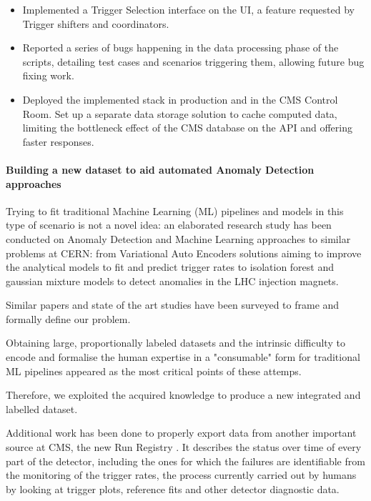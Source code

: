 \documentclass[a4, oneside, 11pt, nobib]{memoir}
\begin{document}
\begin{itemize}
		\item Implemented a Trigger Selection interface on the UI, a feature requested by Trigger shifters and coordinators.
		\item Reported a series of bugs happening in the data processing phase of the scripts, detailing test cases and  scenarios triggering them, allowing future bug fixing work.
		\item Deployed the implemented stack in production and in the CMS Control Room. Set up a separate data storage solution to cache computed data, limiting the bottleneck effect of the CMS database on the API and offering faster responses.

		\end{itemize}


		\paragraph{Building a new dataset to aid automated Anomaly Detection approaches}

		Trying to fit traditional Machine Learning (ML) pipelines and models in this type of scenario is not a novel idea: an elaborated research study has been conducted on Anomaly Detection and Machine Learning approaches to similar problems at CERN: from Variational Auto Encoders solutions \cite{adpol-cvae} aiming to improve the analytical models to fit and predict trigger rates to isolation forest and gaussian mixture models \cite{Halilovic:2665985} to detect anomalies in the LHC injection magnets.

		Similar papers and state of the art studies have been surveyed to frame and formally define our problem.

		Obtaining large, proportionally labeled datasets and the intrinsic difficulty to encode and formalise the human expertise in a "consumable" form for traditional ML pipelines appeared as the most critical points of these attemps.

		Therefore, we exploited the acquired knowledge to produce a new integrated and labelled dataset.

		Additional work has been done to properly export data from another important source at CMS, the new Run Registry \cite{cms_collaboration_2019_3599323}. It describes the status over time of every part of the detector, including the ones for which the failures are identifiable from the monitoring of the trigger rates, the process currently carried out by humans by looking at trigger plots, reference fits and other detector diagnostic data.
\end{document}
